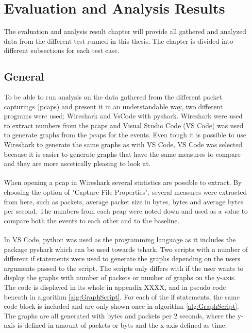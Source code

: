 \chapter{Evaluation and Analysis Results}
The evaluation and analysis result chapter will provide all gathered and analyzed data from the different test runned in this thesis. The chapter is divided into different subsections for each test case. 
\section{General}
To be able to run analysis on the data gathered from the different packet capturings (pcaps) and present it in an understandable way, two different programs were used; Wireshark and VsCode with pyshark. Wireshark were used to extract numbers from the pcaps and Visual Studio Code (VS Code) was used to generate graphs from the pcaps for the events. Even tough it is possible to use Wireshark to generate the same graphs as with VS Code, VS Code was selected because it is easier to generate graphs that have the same measures to compare and they are more ascetically pleasing to look at.  
\\\\
When opening a pcap in Wireshark several statistics are possible to extract. By choosing the option of "Capture File Properties", several measures were extracted from here, such as packets, average packet size in bytes, bytes and average bytes per second. The numbers from each pcap were noted down and used as a value to compare both the events to each other and to the baseline. 
\\\\
In VS Code, python was used as the programming language as it includes the package pyshark which can be used towards tshark. Two scripts with a number of different if statements were used to generate the graphs depending on the users arguments passed to the script. The scripts only differs with if the user wants to display the graphs with number of packets or number of graphs on the y-axis. The code is displayed in its whole in appendix XXXX, and in pseudo code beneath in algorithm \ref{alg:GraphScript}. For each of the if statements, the same code block is included and are only shown once in algorithm \ref{alg:GraphScript}. The graphs are all generated with bytes and packets per 2 seconds, where the y-axis is defined in amount of packets or byts and the x-axis defined as time. 

